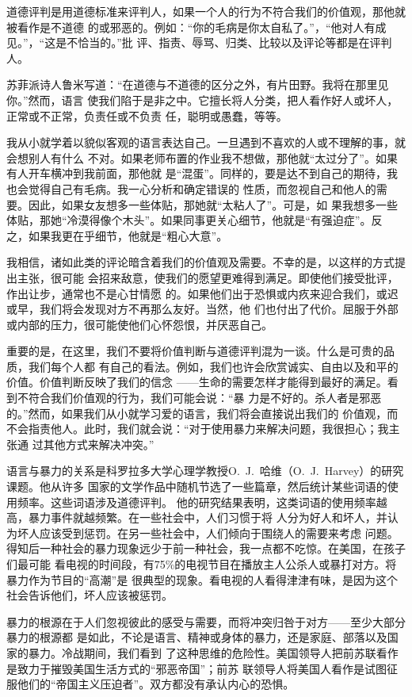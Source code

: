 \documentclass{ctexart}
\begin{document}
道德评判是用道德标准来评判人，如果一个人的行为不符合我们的价值观，那他就被看作是不道德
的或邪恶的。例如：``你的毛病是你太自私了。''，``他对人有成见。''，``这是不恰当的。''批
评、指责、辱骂、归类、比较以及评论等都是在评判人。

苏菲派诗人鲁米写道：``在道德与不道德的区分之外，有片田野。我将在那里见你。''然而，语言
使我们陷于是非之中。它擅长将人分类，把人看作好人或坏人，正常或不正常，负责任或不负责
任，聪明或愚蠢，等等。

我从小就学着以貌似客观的语言表达自己。一旦遇到不喜欢的人或不理解的事，就会想别人有什么
不对。如果老师布置的作业我不想做，那他就``太过分了''。如果有人开车横冲到我前面，那他就
是``混蛋''。同样的，要是达不到自己的期待，我也会觉得自己有毛病。我一心分析和确定错误的
性质，而忽视自己和他人的需要。因此，如果女友想多一些体贴，那她就``太粘人了''。可是，如
果我想多一些体贴，那她``冷漠得像个木头''。如果同事更关心细节，他就是``有强迫症''。反
之，如果我更在乎细节，他就是``粗心大意''。

我相信，诸如此类的评论暗含着我们的价值观及需要。不幸的是，以这样的方式提出主张，很可能
会招来敌意，使我们的愿望更难得到满足。即使他们接受批评，作出让步，通常也不是心甘情愿
的。如果他们出于恐惧或内疚来迎合我们，或迟或早，我们将会发现对方不再那么友好。当然，他
们也付出了代价。屈服于外部或内部的压力，很可能使他们心怀怨恨，并厌恶自己。

重要的是，在这里，我们不要将价值判断与道德评判混为一谈。什么是可贵的品质，我们每个人都
有自己的看法。例如，我们也许会欣赏诚实、自由以及和平的价值。价值判断反映了我们的信念
------生命的需要怎样才能得到最好的满足。看到不符合我们价值观的行为，我们可能会说：``暴
力是不好的。杀人者是邪恶的。''然而，如果我们从小就学习爱的语言，我们将会直接说出我们的
价值观，而不会指责他人。此时，我们就会说：``对于使用暴力来解决问题，我很担心；我主张通
过其他方式来解决冲突。''

语言与暴力的关系是科罗拉多大学心理学教授O.~J.~哈维（O.~J.~Harvey）的研究课题。他从许多
国家的文学作品中随机节选了一些篇章，然后统计某些词语的使用频率。这些词语涉及道德评判。
他的研究结果表明，这类词语的使用频率越高，暴力事件就越频繁。在一些社会中，人们习惯于将
人分为好人和坏人，并认为坏人应该受到惩罚。在另一些社会中，人们倾向于围绕人的需要来考虑
问题。得知后一种社会的暴力现象远少于前一种社会，我一点都不吃惊。在美国，在孩子们最可能
看电视的时间段，有75\%的电视节目在播放主人公杀人或暴打对方。将暴力作为节目的``高潮''是
很典型的现象。看电视的人看得津津有味，是因为这个社会告诉他们，坏人应该被惩罚。

暴力的根源在于人们忽视彼此的感受与需要，而将冲突归咎于对方------至少大部分暴力的根源都
是如此，不论是语言、精神或身体的暴力，还是家庭、部落以及国家的暴力。冷战期间，我们看到
了这种思维的危险性。美国领导人把前苏联看作是致力于摧毁美国生活方式的``邪恶帝国''；前苏
联领导人将美国人看作是试图征服他们的``帝国主义压迫者''。双方都没有承认内心的恐惧。
\end{document}
